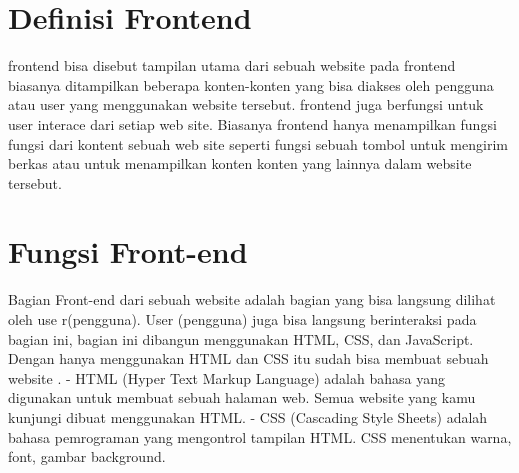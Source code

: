\section{Definisi Frontend}
frontend bisa disebut tampilan utama dari sebuah website pada frontend biasanya ditampilkan beberapa konten-konten yang bisa diakses oleh pengguna atau user yang menggunakan website tersebut. frontend juga berfungsi untuk user interace dari setiap web site. Biasanya frontend hanya menampilkan fungsi fungsi dari kontent sebuah web site seperti fungsi sebuah tombol untuk mengirim berkas atau untuk menampilkan konten konten yang lainnya dalam website tersebut.

\section{Fungsi Front-end}
Bagian Front-end dari sebuah website adalah bagian yang bisa langsung dilihat oleh use r(pengguna). User (pengguna) juga bisa langsung berinteraksi pada bagian ini, bagian ini dibangun menggunakan HTML, CSS, dan JavaScript. Dengan hanya menggunakan HTML dan CSS itu sudah bisa membuat sebuah website .
- HTML (Hyper Text Markup Language) adalah bahasa yang digunakan untuk membuat sebuah halaman web. Semua website yang kamu kunjungi dibuat menggunakan HTML.
- CSS (Cascading Style Sheets) adalah bahasa pemrograman yang mengontrol tampilan HTML. CSS menentukan warna, font, gambar background.


